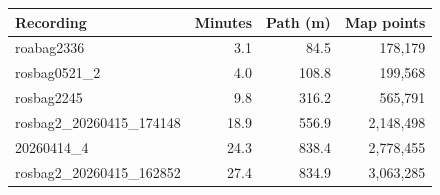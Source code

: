 \begin{tabular}{lrrr}
\toprule
Recording & Minutes & Path (m) & Map points \\
\midrule
roabag2336 & 3.1 & 84.5 & 178,179 \\
rosbag0521\_2 & 4.0 & 108.8 & 199,568 \\
rosbag2245 & 9.8 & 316.2 & 565,791 \\
rosbag2\_20260415\_174148 & 18.9 & 556.9 & 2,148,498 \\
20260414\_4 & 24.3 & 838.4 & 2,778,455 \\
rosbag2\_20260415\_162852 & 27.4 & 834.9 & 3,063,285 \\
\bottomrule
\end{tabular}

